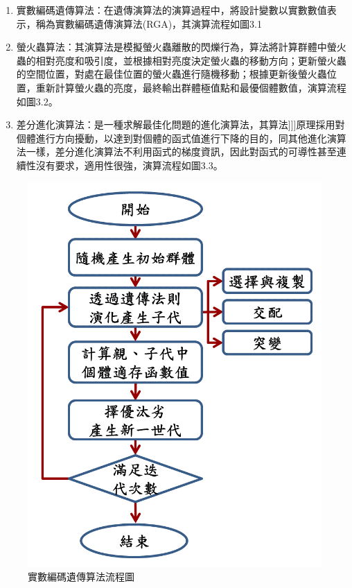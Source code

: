 \documentclass[14pt,a4paper]{report}  %
\newcommand{\fourteen}{\fontsize{14pt}{\baselineskip}\selectfont}%
\begin{document}
      \fourteen {通過隨機變量生成具有路徑限制的機構，生成結構參數來自變數設定，也有其它算法選擇，程式內共包含三種算法：實數編碼遺傳算法、螢火蟲算法與差分進化演算法。}
      \begin{enumerate}
      \item {實數編碼遺傳算法：在遺傳演算法的演算過程中，將設計變數以實數數值表示，稱為實數編碼遺傳演算法(RGA)，其演算流程如圖3.1}
       \item {螢火蟲算法：其演算法是模擬螢火蟲離散的閃爍行為，算法將計算群體中螢火蟲的相對亮度和吸引度，並根據相對亮度決定螢火蟲的移動方向；更新螢火蟲的空間位置，對處在最佳位置的螢火蟲進行隨機移動；根據更新後螢火蟲位置，重新計算螢火蟲的亮度，最終輸出群體極值點和最優個體數值，演算流程如圖3.2。}
       \item {差分進化演算法：是一種求解最佳化問題的進化演算法，其算法]]]原理採用對個體進行方向擾動，以達到對個體的函式值進行下降的目的，同其他進化演算法一樣，差分進化演算法不利用函式的梯度資訊，因此對函式的可導性甚至連續性沒有要求，適用性很強，演算流程如圖3.3。} 
       \end{enumerate}
        \begin{figure}[hbt!]
        \centering
        \includegraphics[scale=0.4]{實數編碼遺傳算法.png} 
        \caption{實數編碼遺傳算法流程圖}
        \label{fig:scale}
        \end{figure}
        
\end{document}
